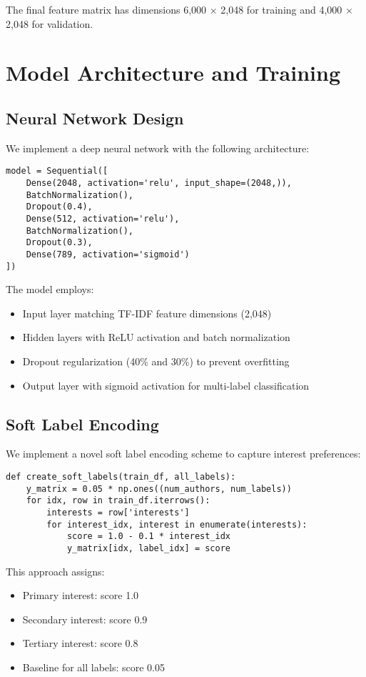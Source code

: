 \documentclass[preprint,12pt]{elsarticle}
\begin{document}
The final feature matrix has dimensions 6,000 × 2,048 for training and 4,000 × 2,048 for validation.

\section{Model Architecture and Training}
\label{sec3}

\subsection{Neural Network Design}
We implement a deep neural network with the following architecture:

\begin{verbatim}
model = Sequential([
    Dense(2048, activation='relu', input_shape=(2048,)),
    BatchNormalization(),
    Dropout(0.4),
    Dense(512, activation='relu'),
    BatchNormalization(),
    Dropout(0.3),
    Dense(789, activation='sigmoid')
])
\end{verbatim}

The model employs:
\begin{itemize}
    \item Input layer matching TF-IDF feature dimensions (2,048)
    \item Hidden layers with ReLU activation and batch normalization
    \item Dropout regularization (40\% and 30\%) to prevent overfitting
    \item Output layer with sigmoid activation for multi-label classification
\end{itemize}

\subsection{Soft Label Encoding}
We implement a novel soft label encoding scheme to capture interest preferences:

\begin{verbatim}
def create_soft_labels(train_df, all_labels):
    y_matrix = 0.05 * np.ones((num_authors, num_labels))
    for idx, row in train_df.iterrows():
        interests = row['interests']
        for interest_idx, interest in enumerate(interests):
            score = 1.0 - 0.1 * interest_idx
            y_matrix[idx, label_idx] = score
\end{verbatim}

This approach assigns:
\begin{itemize}
    \item Primary interest: score 1.0
    \item Secondary interest: score 0.9
    \item Tertiary interest: score 0.8
    \item Baseline for all labels: score 0.05
\end{itemize}
\end{document}
